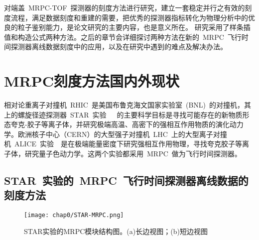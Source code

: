 对端盖~MRPC-TOF~探测器的刻度方法进行研究，建立一套稳定并行之有效的刻度流程，满足数据刻度和重建的需要，把优秀的探测器指标转化为物理分析中的优良的粒子鉴别能力，是论文研究的主要内容，也是意义所在。
研究采用了样条插值和构造公式两种方法。之后的章节会详细探讨两种方法在新的~MRPC~飞行时间探测器离线数据刻度中的应用，以及在研究中遇到的难点及解决办法。

\section{MRPC刻度方法国内外现状}

相对论重离子对撞机~RHIC~是美国布鲁克海文国家实验室~(BNL)~的对撞机，其上的螺旋径迹探测器~STAR~实验~\cite{ruanlj:2005}~\cite{wuj:2005}~\cite{wangy:2010}的主要科学目标是寻找可能存在的新物质形态夸克-胶子等离子体，并研究极端高温、高密下的强相互作用物质的演化动力学。欧洲核子中心（CERN）的大型强子对撞机~LHC~上的大型离子对撞机~ALICE~实验~\cite{A.Alici:2012}~\cite{A.Alici:2014}是在极端能量密度下研究强相互作用物理，寻找夸克胶子等离子体，研究量子色动力学。这两个实验都采用~MRPC~做为飞行时间探测器。

\begin{comment}
~STAR~的~TOF~由~3840~块~MRPC~组成，每块有~6~个读数条。刻度样本选择的是动量在~0.3—0.6Gev/c~的~$\pi$~介子。由于信号在读出条内的反射，每个电子学读出通道的~TOT~（time-over-threshold~\cite{Shao:2009aa}，简称TOT）分布存在多峰，且各不相同，时幅修正的刻度采用样条拟合（spline-fit）的方法。信号在读出条上的传输时间依赖信号传播距离，击中位置的修正只考虑沿读出条方向的效应。扣除起始时间晃动~55~ps后，时间分辨为~75~ps~\cite{Shao:2009aa}。

~ALICE~的~TOF~由~1593~块~MRPC~组成，每块面积为~7.4~cm$\times$~120~cm，每个模块~96~个读出端，每个读出端面积为~2.5~cm$\times$~3.5~cm。刻度样本需要完整的径迹重建。~TOF~刻度分为三个步骤：（1）一个整体的偏移；（2）每个电子学通道的偏移；（3）每个电子学通道的时幅修正。时幅修正采用的是~TOT~的~5~阶多项式拟合。扣除事例起始时间的影响后，时间分辨为~80~ps~\cite{A.A:2005}。
\end{comment}

\subsection{STAR~实验的~MRPC~飞行时间探测器离线数据的刻度方法}
\begin{figure}[!h]
  \centering
  \texttt{[image: chap0/STAR-MRPC.png]}
  \caption{STAR实验的MRPC模块结构图。(a)长边视图；(b)短边视图}
  \label{fig:STAR-MRPC}
\end{figure}

